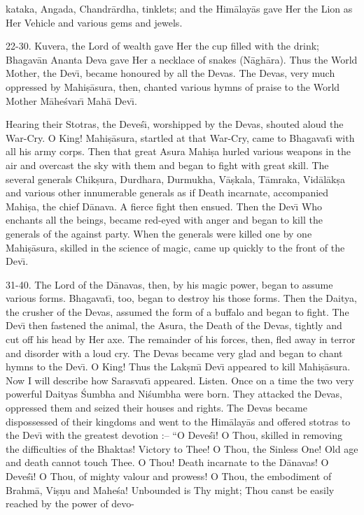 kataka, Angada, Chandr\=ardha, tinklets; and the Him\=alay\=as gave Her the Lion as Her Vehicle and various gems and jewels.

22-30. Kuvera, the Lord of wealth gave Her the cup filled with the drink; Bhagav\=an Ananta Deva gave Her a necklace of snakes (N\=agh\=ara). Thus the World Mother, the Dev\={\i}, became honoured by all the Devas. The Devas, very much oppressed by Mahi\d{s}\=asura, then, chanted various hymns of praise to the World Mother M\=ahe\'svar\={\i} Mah\=a Dev\={\i}.

Hearing their Stotras, the Deve\'s\={\i}, worshipped by the Devas, shouted aloud the War-Cry. O King! Mahi\d{s}\=asura, startled at that War-Cry, came to Bhagavat\={\i} with all his army corps. Then that great Asura Mahi\d{s}a hurled various weapons in the air and overcast the sky with them and began to fight with great skill. The several generals Chik\d{s}ura, Durdhara, Durmukha, V\=a\d{s}kala, T\=amraka, Vid\=al\=ak\d{s}a and various other innumerable generals as if Death incarnate, accompanied Mahi\d{s}a, the chief D\=anava. A fierce fight then ensued. Then the Dev\={\i} Who enchants all the beings, became red-eyed with anger and began to kill the generals of the against party. When the generals were killed one by one Mahi\d{s}\=asura, skilled in the science of magic, came up quickly to the front of the Dev\={\i}.

31-40. The Lord of the D\=anavas, then, by his magic power, began to assume various forms. Bhagavat\={\i}, too, began to destroy his those forms. Then the Daitya, the crusher of the Devas, assumed the form of a buffalo and began to fight. The Dev\={\i} then fastened the animal, the Asura, the Death of the Devas, tightly and cut off his head by Her axe. The remainder of his forces, then, fled away in terror and disorder with a loud cry. The Devas became very glad and began to chant hymns to the Dev\={\i}. O King! Thus the Lak\d{s}m\={\i} Dev\={\i} appeared to kill Mahi\d{s}\=asura. Now I will describe how Sarasvat\={\i} appeared. Listen. Once on a time the two very powerful Daityas \'Sumbha and Ni\'sumbha were born. They attacked the Devas, oppressed them and seized their houses and rights. The Devas became dispossessed of their kingdoms and went to the Him\=alay\=as and offered stotras to the Dev\={\i} with the greatest devotion :-- ``O Deve\'s\={\i}! O Thou, skilled in removing the difficulties of the Bhaktas! Victory to Thee! O Thou, the Sinless One! Old age and death cannot touch Thee. O Thou! Death incarnate to the D\=anavas! O Deve\'s\={\i}! O Thou, of mighty valour and prowess! O Thou, the embodiment of Brahm\=a, Vi\d{s}\d{n}u and Mahe\'sa! Unbounded is Thy might; Thou canst be easily reached by the power of devo-

